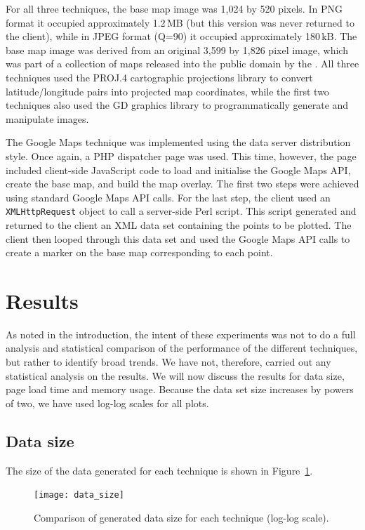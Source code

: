 \documentclass[acmtocl,acmnow]{acmtrans2m}
\begin{document}
For all three techniques, the base map image was 1,024 by 520 pixels. In
PNG format it occupied approximately 1.2\,MB (but this version was never
returned to the client), while in JPEG format (Q=90) it occupied
approximately 180\,kB. The base map image was derived from an original
3,599 by 1,826 pixel image, which was part of a collection of maps
released into the public domain by the . All three
techniques used the PROJ.4 cartographic projections library to convert
latitude/longitude pairs into projected map coordinates, while the first
two techniques also used the GD graphics library to programmatically
generate and manipulate images.

The Google Maps technique was implemented using the data server
distribution style. Once again, a PHP dispatcher page was used. This
time, however, the page included client-side JavaScript code to load and
initialise the Google Maps API, create the base map, and build the map
overlay. The first two steps were achieved using standard Google Maps
API calls. For the last step, the client used an \texttt{XMLHttpRequest}
object to call a server-side Perl script. This script generated and
returned to the client an XML data set containing the points to be
plotted. The client then looped through this data set and used the
Google Maps API calls to create a marker on the base map corresponding
to each point.


\section{Results}
\label{sec-results}

As noted in the introduction, the intent of these experiments was not to
do a full analysis and statistical comparison of the performance of the
different techniques, but rather to identify broad trends. We have not,
therefore, carried out any statistical analysis on the results. We will
now discuss the results for data size, page load time and memory usage.
Because the data set size increases by powers of two, we have used
log-log scales for all plots.



\subsection{Data size}

The size of the data generated for each technique is shown in
Figure~\ref{fig-data-size}.


\begin{figure}
	\begin{center}
		\texttt{[image: data\_size]}
	\end{center}
	\caption{Comparison of generated data size for each technique (log-log scale).}
	\label{fig-data-size}
\end{figure}
\end{document}

